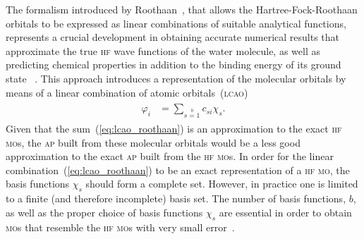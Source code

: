 The formalism introduced by Roothaan~\cite{Roothaan_HF}, that allows
the Hartree-Fock-Roothaan orbitals to be expressed as linear
combinations of suitable analytical functions, represents a crucial
development in obtaining accurate numerical results that approximate
the true \textsc{hf} wave functions of the water molecule, as well as
predicting chemical properties in addition to the binding energy of
its ground state
~\cite{scf_lc_1967,EllisonShullh2o_1955,Neumann_gaussian_1968,Pitzer_1970,Pitzer_1972}.
This approach introduces a representation of the molecular orbitals by
means of a linear combination of atomic
orbitals~(\textsc{lcao})~\cite{Roothaan_HF}
%
\begin{eqnarray}
  \begin{split}
    \varphi_{i} & = \sum\limits_{s=1}\limits^{b} c_{si} \chi_{s}.
  \end{split}
  \label{eq:lcao_roothaan}
\end{eqnarray}
%
Given that the sum~(\ref{eq:lcao_roothaan}) is an approximation to the
exact \textsc{hf} \textsc{mo}s, the \textsc{ap} built from these
molecular orbitals would be a less good approximation to the exact
\textsc{ap} built from the \textsc{hf} \textsc{mo}s. In order for the
linear combination~(\ref{eq:lcao_roothaan}) to be an exact
representation of a \textsc{hf} \textsc{mo}, the basis functions
$\chi_{s}$ should form a complete set. However, in practice one is
limited to a finite (and therefore incomplete) basis set. The number
of basis functions, $b$, as well as the proper choice of basis
functions $\chi_{s}$ are essential in order to obtain \textsc{mo}s
that resemble the \textsc{hf} \textsc{mo}s with very small
error~\cite{Moccia_JCP_2164,Moccia_JCP_2176,Moccia_1964}.


